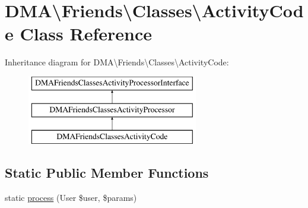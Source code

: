 \hypertarget{classDMA_1_1Friends_1_1Classes_1_1ActivityCode}{\section{D\+M\+A\textbackslash{}Friends\textbackslash{}Classes\textbackslash{}Activity\+Code Class Reference}
\label{classDMA_1_1Friends_1_1Classes_1_1ActivityCode}
}
Inheritance diagram for D\+M\+A\textbackslash{}Friends\textbackslash{}Classes\textbackslash{}Activity\+Code\+:\begin{figure}[H]
\begin{center}
\leavevmode
\includegraphics[height=3.000000cm]{d0/dbd/classDMA_1_1Friends_1_1Classes_1_1ActivityCode}
\end{center}
\end{figure}
\subsection*{Static Public Member Functions}
\begin{DoxyCompactItemize}
\item 
static \hyperlink{classDMA_1_1Friends_1_1Classes_1_1ActivityCode_aac52c5b2721f592cb941fe2d3fb516bc}{process} (User \$user, \$params)
\end{DoxyCompactItemize}


